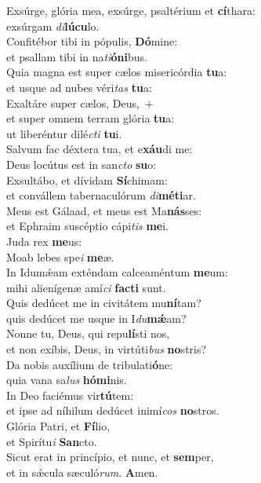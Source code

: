 \evenverse Exsúrge, glória mea, exsúrge, psaltérium et \textbf{cí}thara:~\*\\
\evenverse exsúrgam \textit{di}\textbf{lú}\textbf{cu}lo.\\
\oddverse Confitébor tibi in pópulis, \textbf{Dó}mine:~\*\\
\oddverse et psallam tibi in na\textit{ti}\textbf{ó}\textbf{ni}bus.\\
\evenverse Quia magna est super cælos misericórdia \textbf{tu}a:~\*\\
\evenverse et usque ad nubes véri\textit{tas} \textbf{tu}a:\\
\oddverse Exaltáre super cælos, Deus,~+\\
\oddverse  et super omnem terram glória \textbf{tu}a:~\*\\
\oddverse ut liberéntur dilé\textit{cti} \textbf{tu}i.\\
\evenverse Salvum fac déxtera tua, et e\textbf{xáu}di me:~\*\\
\evenverse Deus locútus est in san\textit{cto} \textbf{su}o:\\
\oddverse Exsultábo, et dívidam \textbf{Sí}chimam:~\*\\
\oddverse et convállem tabernaculórum \textit{di}\textbf{mé}\textbf{ti}ar.\\
\evenverse Meus est Gálaad, et meus est Ma\textbf{nás}ses:~\*\\
\evenverse et Ephraim suscéptio cápi\textit{tis} \textbf{me}i.\\
\oddverse Juda rex \textbf{me}us:~\*\\
\oddverse Moab lebes spe\textit{i} \textbf{me}æ.\\
\evenverse In Idumǽam exténdam calceaméntum \textbf{me}um:~\*\\
\evenverse mihi alienígenæ amí\textit{ci} \textbf{fa}\textbf{cti} sunt.\\
\oddverse Quis dedúcet me in civitátem mu\textbf{ní}tam?~\*\\
\oddverse quis dedúcet me usque in I\textit{du}\textbf{mǽ}am?\\
\evenverse Nonne tu, Deus, qui repu\textbf{lí}sti nos,~\*\\
\evenverse et non exíbis, Deus, in virtúti\textit{bus} \textbf{no}stris?\\
\oddverse Da nobis auxílium de tribulati\textbf{ó}ne:~\*\\
\oddverse quia vana sa\textit{lus} \textbf{hó}\textbf{mi}nis.\\
\evenverse In Deo faciémus vir\textbf{tú}tem:~\*\\
\evenverse et ipse ad níhilum dedúcet inimí\textit{cos} \textbf{no}stros.\\
\oddverse Glória Patri, et \textbf{Fí}lio,~\*\\
\oddverse et Spirítu\textit{i} \textbf{San}cto.\\
\evenverse Sicut erat in princípio, et nunc, et \textbf{sem}per,~\*\\
\evenverse et in sǽcula sæculó\textit{rum}. \textbf{A}men.\\
